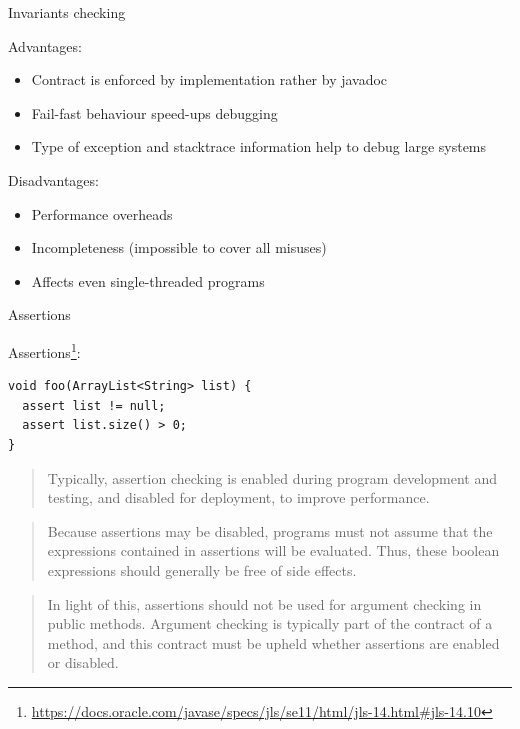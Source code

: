 
\begin{frame}[fragile,t]{Invariants checking}

Advantages:
\begin{itemize}
  \item Contract is enforced by implementation rather by javadoc
  \item Fail-fast behaviour speed-ups debugging
  \item Type of exception and stacktrace information help to debug large systems 
\end{itemize}

Disadvantages:
\begin{itemize}
  \item Performance overheads
  \item Incompleteness (impossible to cover all misuses)
  \item Affects even single-threaded programs
\end{itemize}
\end{frame}


\begin{frame}[fragile,t]{Assertions}

Assertions\footnote{\tiny\url{https://docs.oracle.com/javase/specs/jls/se11/html/jls-14.html#jls-14.10}}:

\begin{verbatim}
void foo(ArrayList<String> list) {
  assert list != null;
  assert list.size() > 0;
}
\end{verbatim}

\pause

\begin{quote}
Typically, assertion checking is enabled during program development and testing, and disabled for deployment, to improve performance.
\end{quote}

\pause

\begin{quote}
Because assertions may be disabled, programs must not assume that the expressions contained in assertions will be evaluated. Thus, these boolean expressions should generally be free of side effects. 
\end{quote}

\pause

\begin{quote}
In light of this, assertions should not be used for argument checking in public methods. Argument checking is typically part of the contract of a method, and this contract must be upheld whether assertions are enabled or disabled.
\end{quote}

\end{frame}


